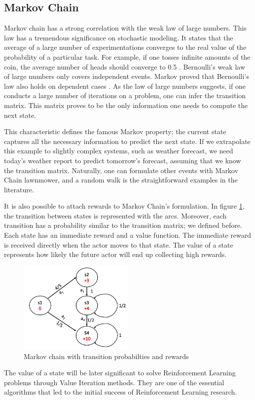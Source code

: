 \subsection{Markov Chain}

Markov chain has a strong correlation with the weak law of large numbers. This law has a tremendous significance on stochastic modeling. It states that the average of a large number of experimentations converges to the real value of the probability of a particular task. For example, if one tosses infinite amounts of the coin, the average number of heads should converge to 0.5 \cite{Gagniuc2017}. 
Bernoulli's weak law of large numbers only covers independent events. Markov proved that Bernoulli's law also holds on dependent cases \cite{Gagniuc2017}. 
As the law of large numbers suggests, if one conducts a large number of iterations on a problem, one can infer the transition matrix. This matrix proves to be the only information one needs to compute the next state.

This characteristic defines the famous Markov property; the current state captures all the necessary information to predict the next state. If we extrapolate this example to slightly complex systems, such as weather forecast, we need today's weather report to predict tomorrow's forecast, assuming that we know the transition matrix. Naturally, one can formulate other events with Markov Chain lawnmower, and a random walk is the straightforward examples in the literature\cite{Gagniuc2017}.

It is also possible to attach rewards to Markov Chain's formulation. In figure \ref{fig: markov_chain}, the transition between states is represented with the arcs. Moreover, each transition has a probability similar to the transition matrix; we defined before. Each state has an immediate reward and a value function. The immediate reward is received directly when the actor moves to that state. The value of a state represents how likely the future actor will end up collecting high rewards. 

\begin{figure}[htbp]
    \centering
    \includegraphics[width=0.5\textwidth]{figures/markovchain}
    \caption{Markov chain with transition probabilties and rewards}
    \label{fig: markov_chain}
\end{figure}

The value of a state will be later significant to solve Reinforcement Learning problems through Value Iteration methods. They are one of the essential algorithms that led to the initial success of Reinforcement Learning research.
